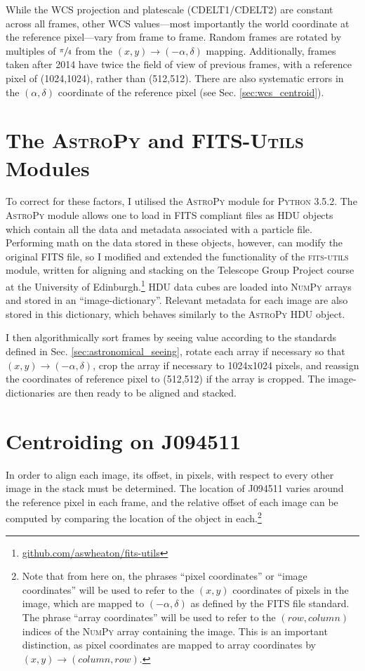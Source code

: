 \documentclass[a4paper,11pt]{article}
\begin{document}
While the WCS projection and platescale (CDELT1/CDELT2) are constant across all frames, other WCS values---most importantly the world coordinate at the reference pixel---vary from frame to frame. Random frames are rotated by multiples of $\sfrac{\pi}{4}$ from the $(x,y) \rightarrow (-\alpha, \delta)$ mapping. Additionally, frames taken after 2014 have twice the field of view of previous frames, with a reference pixel of (1024,1024), rather than (512,512). There are also systematic errors in the $(\alpha, \delta)$ coordinate of the reference pixel (see Sec. \ref{sec:wcs_centroid}).

\section{The \textsc{AstroPy} and \textsc{FITS-Utils} Modules}

To correct for these factors, I utilised the \textsc{AstroPy} module for \textsc{Python 3.5.2}. The \textsc{AstroPy} module allows one to load in FITS compliant files as HDU objects which contain all the data and metadata associated with a particle file. Performing math on the data stored in these objects, however, can modify the original FITS file\cite{astropy_2013}\cite{astropy_2018}, so I modified and extended the functionality of the \textsc{fits-utils} module, written for aligning and stacking on the Telescope Group Project course at the University of Edinburgh.\footnote{\url{github.com/aswheaton/fits-utils}} HDU data cubes are loaded into \textsc{NumPy} arrays and stored in an ``image-dictionary''. Relevant metadata for each image are also stored in this dictionary, which behaves similarly to the \textsc{AstroPy} HDU object.

I then algorithmically sort frames by seeing value according to the standards defined in Sec. \ref{sec:astronomical_seeing}, rotate each array if necessary so that $(x,y) \rightarrow (-\alpha, \delta)$, crop the array if necessary to 1024x1024 pixels, and reassign the coordinates of reference pixel to (512,512) if the array is cropped. The image-dictionaries are then ready to be aligned and stacked.

\section{Centroiding on J094511}

In order to align each image, its offset, in pixels, with respect to every other image in the stack must be determined. The location of J094511 varies around the reference pixel in each frame, and the relative offset of each image can be computed by comparing the location of the object in each.\footnote{Note that from here on, the phrases ``pixel coordinates'' or ``image coordinates'' will be used to refer to the $(x,y)$ coordinates of pixels in the image, which are mapped to $(-\alpha,\delta)$ as defined by the FITS file standard\cite{FITS_standard}. The phrase ``array coordinates'' will be used to refer to the $(row,column)$ indices of the \textsc{NumPy} array containing the image. This is an important distinction, as pixel coordinates are mapped to array coordinates by $(x,y) \rightarrow (column, row)$.}
\end{document}
